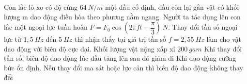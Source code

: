 \begin{ex}
Con lắc lò xo có độ cứng $64\ N/m$ một đầu cố định, đầu còn lại gắn vật có khối lượng m dao động điều hòa theo phương nằm ngang. Người ta tác dụng lên con lắc một ngoại lực tuần hoàn $F = F_0\cos \left(2 \pi f t - \dfrac{\pi}{3}\right)\ N$. Thay đổi tần số ngoại lực từ $1,5\ Hz$ đến $5\ Hz$ thì nhận thấy tại giá trị tần số $f = 2,55\ Hz$ làm cho vật dao động với biên độ cực đại.
{Khối lượng vật nặng  xấp xỉ  $200\ gam$}
{\True Khi thay đổi tần số, biên độ dao động lúc đầu tăng lên sau đó giảm đi}
{Khi dao động cưỡng bức ổn định. Nếu thay đổi ma sát hoặc lực cản thì biên độ dao động không thay đổi}
\loigiai{
\begin{itemchoice}
\itemch
\itemch
\itemch
\itemch
\end{itemchoice}	
}
\end{ex}

